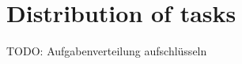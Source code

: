 \documentclass[
10pt, %
a4paper, %
oneside, %
headinclude,footinclude, %
BCOR5mm, %
]{scrartcl}
\begin{document}
\newpage

\section{Distribution of tasks}

TODO: Aufgabenverteilung aufschlüsseln


\listoffigures %

\listoftables %



\renewcommand{\refname}{\spacedlowsmallcaps{References}} %




\end{document}
